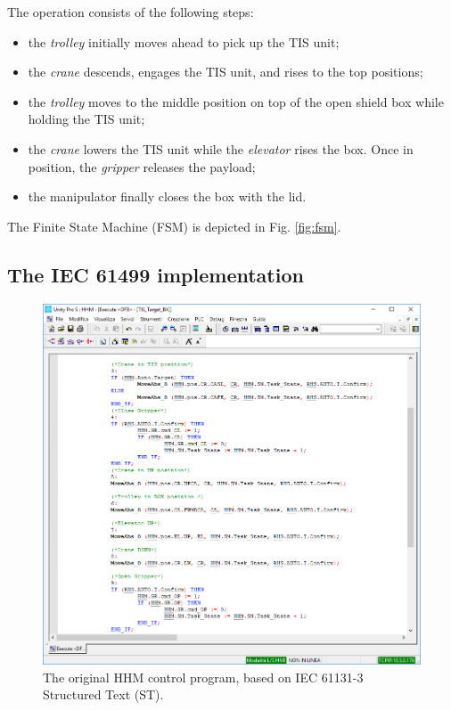 \documentclass{ieeeojies}
\begin{document}
\newpage

\noindent The operation consists of the following steps:
\begin{itemize}
  \item the \textit{trolley} initially moves ahead to pick up the TIS unit;
  \item the \textit{crane} descends, engages the TIS unit, and rises to the top positions;
  \item the \textit{trolley} moves to the middle position on top of the open shield box while holding the TIS unit;
  \item the \textit{crane} lowers the TIS unit while the \textit{elevator} rises the box. Once in position, the \textit{gripper} releases the payload;
  \item the manipulator finally closes the box with the lid.
\end{itemize}
The Finite State Machine (FSM) is depicted in Fig. \ref{fig:fsm}.


\subsection{The IEC 61499 implementation}

\begin{figure}[b!]
    \vspace*{-5mm}
	\centering
    \includegraphics[width=\columnwidth]{pictures/lilli04.png}
    \caption{The original HHM control program, based on IEC 61131-3 Structured Text (ST).} 
    \label{fig:iec61131}
\end{figure}
\end{document}
